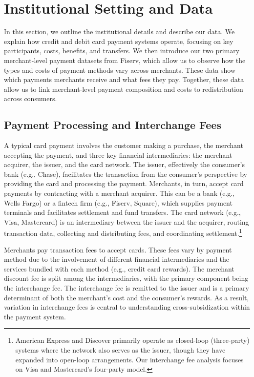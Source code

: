 \documentclass[main.tex]{subfiles}
\begin{document}
\section{Institutional Setting and Data\label{sec:institutional-data}}

In this section, we outline the institutional details and describe our data.
We explain how credit and debit card payment systems operate, focusing on key participants, costs, benefits, and transfers.
We then introduce our two primary merchant-level payment datasets from Fiserv, which allow us to observe how the types and costs of payment methods vary across merchants.
These data show which payments merchants receive and what fees they pay.
Together, these data allow us to link merchant-level payment composition and costs to redistribution across consumers.

\subsection{Payment Processing and Interchange Fees}

A typical card payment involves the customer making a purchase, the merchant accepting the payment, and three key financial intermediaries: the merchant acquirer, the issuer, and the card network.
The issuer, effectively the consumer's bank (e.g., Chase), facilitates the transaction from the consumer's perspective by providing the card and processing the payment.
Merchants, in turn, accept card payments by contracting with a merchant acquirer.
This can be a bank (e.g., Wells Fargo) or a fintech firm (e.g., Fiserv, Square), which supplies payment terminals and facilitates settlement and fund transfers.
The card network (e.g., Visa, Mastercard) is an intermediary between the issuer and the acquirer, routing transaction data, collecting and distributing fees, and coordinating settlement.\footnote{American Express and Discover primarily operate as closed-loop (three-party) systems where the network also serves as the issuer, though they have expanded into open-loop arrangements. Our interchange fee analysis focuses on Visa and Mastercard's four-party model.}

Merchants pay transaction fees to accept cards. These fees vary by payment method due to the involvement of different financial intermediaries and the services bundled with each method (e.g., credit card rewards).
The merchant discount fee is split among the intermediaries, with the primary component being the interchange fee.
The interchange fee is remitted to the issuer and is a primary determinant of both the merchant's cost and the consumer's rewards.
As a result, variation in interchange fees is central to understanding cross-subsidization within the payment system.
\end{document}
